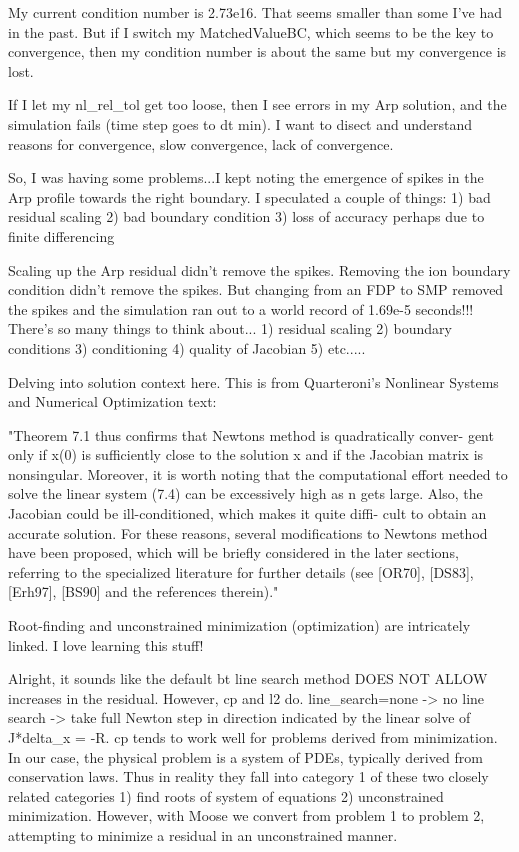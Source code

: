 {My current condition number is 2.73e16. That seems smaller than some I've had in the past. But if I switch my MatchedValueBC, which seems to be the key to convergence, then my condition number is about the same but my convergence is lost.

If I let my nl_rel_tol get too loose, then I see errors in my Arp solution, and the simulation fails (time step goes to dt min). I want to disect and understand reasons for convergence, slow convergence, lack of convergence.

So, I was having some problems...I kept noting the emergence of spikes in the Arp profile towards the right boundary. I speculated a couple of things: 1) bad residual scaling 2) bad boundary condition 3) loss of accuracy perhaps due to finite differencing

Scaling up the Arp residual didn't remove the spikes. Removing the ion boundary condition didn't remove the spikes. But changing from an FDP to SMP removed the spikes and the simulation ran out to a world record of 1.69e-5 seconds!!! There's so many things to think about... 1) residual scaling 2) boundary conditions 3) conditioning 4) quality of Jacobian 5) etc.....

Delving into solution context here. This is from Quarteroni's Nonlinear Systems and Numerical Optimization text:

"Theorem 7.1 thus confirms that Newtons method is quadratically conver-
gent only if x(0) is sufficiently close to the solution x and if the Jacobian
matrix is nonsingular. Moreover, it is worth noting that the computational
effort needed to solve the linear system (7.4) can be excessively high as n
gets large. Also, the Jacobian could be ill-conditioned, which makes it quite diffi-
cult to obtain an accurate solution. For these reasons, several modifications
to Newtons method have been proposed, which will be briefly considered
in the later sections, referring to the specialized literature for further details
(see [OR70], [DS83], [Erh97], [BS90] and the references therein)."

Root-finding and unconstrained minimization (optimization) are intricately linked. I love learning this stuff!

Alright, it sounds like the default bt line search method DOES NOT ALLOW increases in the residual. However, cp and l2 do. line_search=none -> no line search -> take full Newton step in direction indicated by the linear solve of J*delta_x = -R. cp tends to work well for problems derived from minimization. In our case, the physical problem is a system of PDEs, typically derived from conservation laws. Thus in reality they fall into category 1 of these two closely related categories 1) find roots of system of equations 2) unconstrained minimization. However, with Moose we convert from problem 1 to problem 2, attempting to minimize a residual in an unconstrained manner.

}
